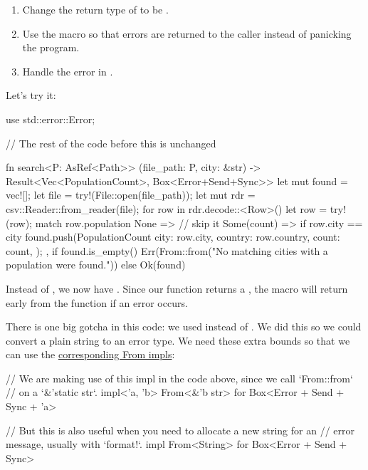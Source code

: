 \begin{enumerate}
  \item{Change the return type of  to be .}
  \item{Use the  macro so that errors are returned to the caller instead of panicking the program.}
  \item{Handle the error in .}
\end{enumerate}

Let's try it:

\begin{rustc}
use std::error::Error;

// The rest of the code before this is unchanged

fn search<P: AsRef<Path>>
         (file_path: P, city: &str)
         -> Result<Vec<PopulationCount>, Box<Error+Send+Sync>> {
    let mut found = vec![];
    let file = try!(File::open(file_path));
    let mut rdr = csv::Reader::from_reader(file);
    for row in rdr.decode::<Row>() {
        let row = try!(row);
        match row.population {
            None => { } // skip it
            Some(count) => if row.city == city {
                found.push(PopulationCount {
                    city: row.city,
                    country: row.country,
                    count: count,
                });
            },
        }
    }
    if found.is_empty() {
        Err(From::from("No matching cities with a population were found."))
    } else {
        Ok(found)
    }
}
\end{rustc}

Instead of , we now have . Since our function returns a , the 
 macro will return early from the function if an error occurs.

\blank

There is one big gotcha in this code: we used  instead of . We did this 
so we could convert a plain string to an error type. We need these extra bounds so that we can use the 
\href{https://doc.rust-lang.org/std/convert/trait.From.html}{corresponding From impls}:

\begin{rustc}
// We are making use of this impl in the code above, since we call `From::from`
// on a `&'static str`.
impl<'a, 'b> From<&'b str> for Box<Error + Send + Sync + 'a>

// But this is also useful when you need to allocate a new string for an
// error message, usually with `format!`.
impl From<String> for Box<Error + Send + Sync>
\end{rustc}

